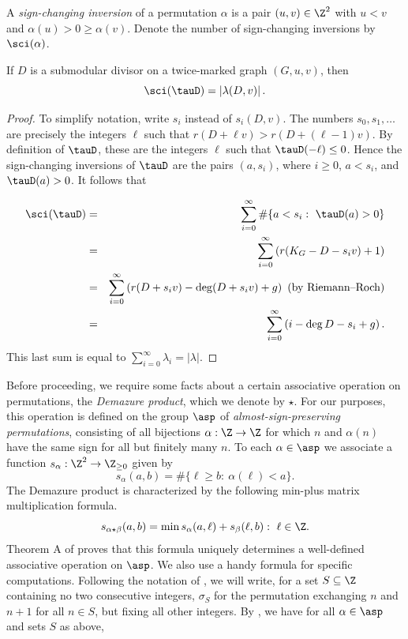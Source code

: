 \begin{defi}
A \emph{sign-changing inversion} of a permutation $\alpha$ is a pair $(u,v) \in \Z^2$ with $u<v$ and $\alpha(u) > 0 \geq \alpha(v)$. Denote the number of sign-changing inversions by $\sci(\alpha)$.
\end{defi}

\begin{prop}\label{prop:sciLambda}
If $D$ is a submodular divisor on a twice-marked graph $(G,u,v)$, then
$$\sci(\tauD) = \left| \lambda(D,v) \right|.$$
\end{prop}

\begin{proof}
To simplify notation, write $s_i$ instead of $s_i(D,v)$.
The numbers $s_0, s_1, \ldots$ are precisely the integers $\ell$ such that $r(D+\ell v) > r(D + (\ell-1)v)$. By definition of $\tauD$, these are the integers $\ell$ such that $\tauD(-\ell) \leq 0$. Hence the sign-changing inversions of $\tauD$ are the pairs $(a,s_i)$, where $i \geq 0$, $a < s_i$, and $\tauD(a) > 0$.
It follows that

\begin{eqnarray*}
\sci(\tauD) &=& \sum_{i=0}^\infty \# \{ a < s_i:\ \tauD(a) > 0 \}\\
&=& \sum_{i=0}^\infty \left( r(K_G - D - s_i v) + 1\right)\\
&=& \sum_{i=0}^\infty \left( r(D + s_i v) - \deg( D + s_i v) +g\right) \mbox{ (by Riemann--Roch)}\\
&=& \sum_{i=0}^\infty \left( i - \deg D - s_i + g \right).\\
\end{eqnarray*}
This last sum is equal to $\displaystyle \sum_{i=0}^\infty \lambda_i = |\lambda|$.
\end{proof}

Before proceeding, we require some facts about a certain associative operation on permutations, the \emph{Demazure product}, which we denote by $\star$. For our purposes, this operation is defined on the group $\asp$ of \emph{almost-sign-preserving permutations}, consisting of all bijections $\alpha: \Z \to \Z$ for which $n$ and $\alpha(n)$ have the same sign for all but finitely many $n$. To each $\alpha \in \asp$ we associate a function $s_\alpha: \Z^2 \to \Z_{\geq 0}$ given by
$$s_\alpha(a,b) = \# \{\ell \geq b:\ \alpha(\ell) < a\}.$$
The Demazure product is characterized by the following min-plus matrix multiplication formula.
$$s_{\alpha \star \beta}(a,b) = \min{
s_\alpha(a,\ell) + s_\beta(\ell,b):\ \ell \in \Z
}.$$
Theorem A of \cite{PflDemProd} proves that this formula uniquely determines a well-defined associative operation on $\asp$. We also use a handy formula for specific computations. Following the notation of \cite{PflDemProd}, we will write, for a set $S \subseteq \Z$ containing no two consecutive integers, $\sigma_S$ for the permutation exchanging $n$ and $n+1$ for all $n \in S$, but fixing all other integers. By \cite[Theorem 8.7]{PflDemProd}, we have for all $\alpha \in \asp$ and sets $S$ as above,


